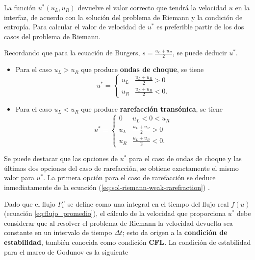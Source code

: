 \documentclass[12pt]{article}
\begin{document}
 	
 	La función $u^{*}(u_L, u_R)$ devuelve el valor correcto que tendrá la velocidad $u$ en la interfaz, de acuerdo con la solución del problema de Riemann y la condición de entropía. Para calcular el valor de velocidad de $u^{*}$ es preferible partir de los dos casos del problema de Riemann.
 	
	Recordando que para la ecuación de Burgers, $s = \frac{u_L + u_R}{2}$, se puede deducir $u^{*}$. 
 	
 	\begin{itemize}
 		\item Para el caso $u_L > u_R$ que produce \textbf{ondas de choque}, se tiene
 		\begin{equation}
 			u^{*} =
 			\begin{cases}
 				u_{L} & \frac{u_L + u_R}{2} > 0 \\
 				u_{R} & \frac{u_L + u_R}{2} < 0.
 			\end{cases}
 		\label{eq:uprima1}
 		\end{equation}
 		\item Para el caso $u_L < u_R$ que produce \textbf{rarefacción transónica}, se tiene
 		\begin{equation}
 			u^{*} =
 			\begin{cases}
 				0 & u_{L} < 0 < u_{R}\\
 				u_{L} & \frac{u_L + u_R}{2} > 0 \\
 				u_{R} & \frac{u_L + u_R}{2} < 0.
 			\end{cases}
 		\label{eq:uprima2}
 		\end{equation}
 	\end{itemize}
 	Se puede destacar que las opciones de $u^{*}$ para el caso de ondas de choque y las últimas dos opciones del caso de rarefacción, se obtiene exactamente el mismo valor para $u^{*}$. La primera opción para el caso de rarefacción se deduce inmediatamente de la ecuación (\ref{eq:sol-riemann-weak-rarefraction}) \cite{pletcher1997computational}.
 	
 	Dado que el flujo $F_{i}^{n}$ se define como una integral en el tiempo del flujo real $f(u)$ (ecuación \ref{eq:flujo_promedio}), el cálculo de la velocidad que proporciona $u^{*}$ debe considerar que al resolver el problema de Riemann la velocidad devuelta sea constante en un intervalo de tiempo $\Delta t$; esto da origen a la \textbf{condición de estabilidad}, también conocida como condición \textbf{CFL.} La condición de estabilidad para el marco de Godunov es la siguiente \cite{pletcher1997computational}
 	
\end{document}
